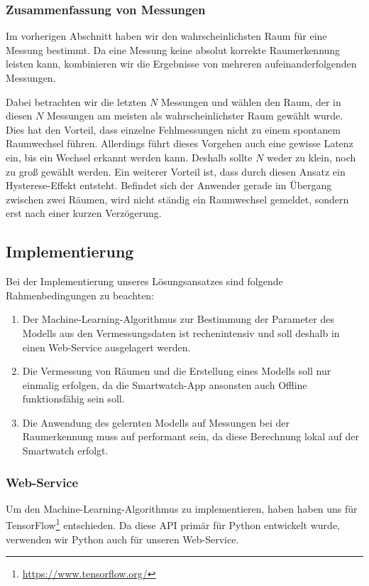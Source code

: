 \subsubsection{Zusammenfassung von Messungen}
\label{sec:lok-zusammenfassung-messungen}

Im vorherigen Abschnitt haben wir den wahrscheinlichsten Raum für eine Messung bestimmt.
Da eine Messung keine absolut korrekte Raumerkennung leisten kann, kombinieren wir
die Ergebnisse von mehreren aufeinanderfolgenden Messungen.

Dabei betrachten wir die letzten $N$ Messungen und wählen den Raum, der in diesen
$N$ Messungen am meisten als wahrscheinlichster Raum gewählt wurde.
Dies hat den Vorteil, dass einzelne Fehlmessungen nicht zu einem spontanem Raumwechsel
führen. Allerdings führt dieses Vorgehen auch eine gewisse Latenz ein, bis ein Wechsel
erkannt werden kann. Deshalb sollte $N$ weder zu klein, noch zu groß gewählt werden.
Ein weiterer Vorteil ist, dass durch diesen Ansatz ein Hysterese-Effekt entsteht.
Befindet sich der Anwender gerade im Übergang zwischen zwei Räumen, wird nicht ständig
ein Raumwechsel gemeldet, sondern erst nach einer kurzen Verzögerung.
  
\subsection{Implementierung}

Bei der Implementierung unseres Lösungsansatzes sind folgende Rahmenbedingungen zu beachten:
\begin{enumerate}
	\item Der Machine-Learning-Algorithmus zur Bestimmung der Parameter des Modells aus
		den Vermessungsdaten ist rechenintensiv und soll deshalb in einen Web-Service
		ausgelagert werden.
	\item Die Vermessung von Räumen und die Erstellung eines Modells soll nur einmalig
		erfolgen, da die Smartwatch-App ansonsten auch Offline funktionsfähig sein soll.
	\item Die Anwendung des gelernten Modells auf Messungen bei der Raumerkennung muss
		auf performant sein, da diese Berechnung lokal auf der Smartwatch erfolgt.
\end{enumerate}

\subsubsection{Web-Service}

Um den Machine-Learning-Algorithmus zu implementieren, haben haben uns für
TensorFlow\footnote{\url{https://www.tensorflow.org/}} entschieden.
Da diese API primär für Python entwickelt wurde, verwenden wir Python auch
für unseren Web-Service.

